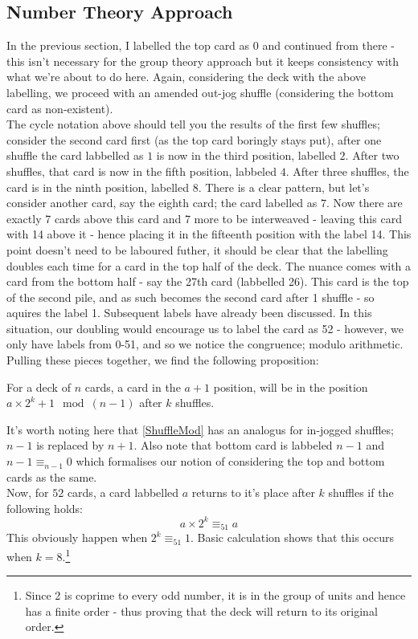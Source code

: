 \documentclass[../../Axiomathic.tex]{subfiles}
\begin{document}
\subsection{Number Theory Approach}
In the previous section, I labelled the top card as $0$ and continued from there - this isn't necessary for the group theory approach but it keeps consistency with what we're about to do here. Again, considering the deck with the above labelling, we proceed with an amended out-jog shuffle (considering the bottom card as non-existent).\\
The cycle notation above should tell you the results of the first few shuffles; consider the second card first (as the top card boringly stays put), after one shuffle the card labbelled as $1$ is now in the third position, labelled $2$. After two shuffles, that card is now in the fifth position, labbeled $4$. After three shuffles, the card is in the ninth position, labelled $8$. There is a clear pattern, but let's consider another card, say the eighth card; the card labelled as $7$. Now there are exactly 7 cards above this card and 7 more to be interweaved - leaving this card with 14 above it - hence placing it in the fifteenth position with the label 14. This point doesn't need to be laboured futher, it should be clear that the labelling doubles each time for a card in the top half of the deck. The nuance comes with a card from the bottom half - say the 27th card (labbelled 26). This card is the top of the second pile, and as such becomes the second card after 1 shuffle - so aquires the label 1. Subsequent labels have already been discussed. In this situation, our doubling would encourage us to label the card as 52 - however, we only have labels from 0-51, and so we notice the congruence; modulo arithmetic. Pulling these pieces together, we find the following proposition:\\
\begin{prop} \label{ShuffleMod} For a deck of $n$ cards, a card in the $a+1$ position, will be in the position $a \times 2^k+1 \mod(n-1)$ after $k$ shuffles. \end{prop}

It's worth noting here that \ref{ShuffleMod} has an analogus for in-jogged shuffles; $n-1$ is replaced by $n+1$. Also note that bottom card is labbeled $n-1$ and $n-1 \equiv_{n-1}0$ which formalises our notion of considering the top and bottom cards as the same. \\
Now, for $52$ cards, a card labbelled $a$ returns to it's place after $k$ shuffles if the following holds: \[ a \times 2^k \equiv_{51} a\] This obviously happen when $2^k \equiv_{51} 1$. Basic calculation shows that this occurs when $k=8$.\footnote{Since 2 is coprime to every odd number, it is in the group of units and hence has a finite order - thus proving that the deck will return to its original order.}
\end{document}
